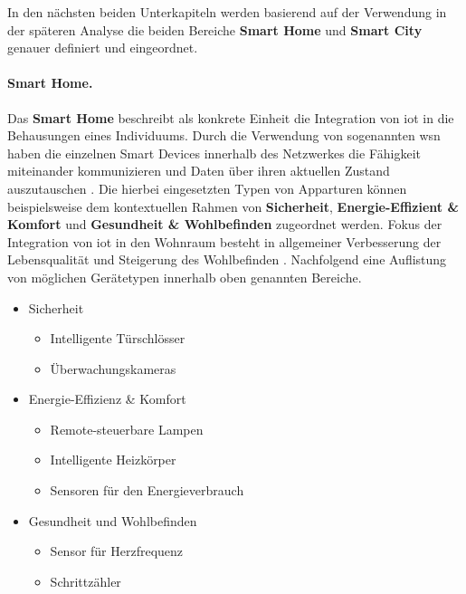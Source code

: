 \noindent In den nächsten beiden Unterkapiteln werden basierend auf der Verwendung in der späteren Analyse die beiden Bereiche \textbf{Smart Home} und \textbf{Smart City} genauer definiert und eingeordnet.

\paragraph{Smart Home.}
\label{sec:Grundlagen:para:Smart Home}
Das \textbf{Smart Home} beschreibt als konkrete Einheit die Integration von \ac{iot} in die Behausungen eines Individuums. Durch die Verwendung von sogenannten \acl{wsn} haben die einzelnen Smart Devices innerhalb des Netzwerkes die Fähigkeit miteinander kommunizieren und Daten über ihren aktuellen Zustand auszutauschen \cite{Biljana2017}. Die hierbei eingesetzten Typen von Apparturen können beispielsweise dem kontextuellen Rahmen von \textbf{Sicherheit}, \textbf{Energie-Effizient \& Komfort} und \textbf{Gesundheit \& Wohlbefinden} zugeordnet werden. Fokus der Integration von \ac{iot} in den Wohnraum besteht in allgemeiner Verbesserung der Lebensqualität und Steigerung des Wohlbefinden \cite{Bastos2018}. Nachfolgend eine Auflistung von möglichen Gerätetypen innerhalb oben genannten Bereiche.

\begin{itemize}
	\item Sicherheit
		\begin{itemize}
			\item Intelligente Türschlösser
			\item Überwachungskameras
		\end{itemize}
	\item Energie-Effizienz \& Komfort
		\begin{itemize}
			\item Remote-steuerbare Lampen
			\item Intelligente Heizkörper
			\item Sensoren für den Energieverbrauch
		\end{itemize}
	\item Gesundheit und Wohlbefinden
		\begin{itemize}
			\item Sensor für Herzfrequenz
			\item Schrittzähler
		\end{itemize}
\end{itemize}

